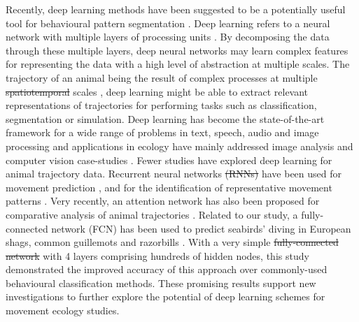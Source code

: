 \documentclass{article}
\providecommand{\DIFaddtex}[1]{{\protect\color{blue}\uwave{#1}}} %
\providecommand{\DIFdeltex}[1]{{\protect\color{red}\sout{#1}}}                      %
\providecommand{\DIFaddbegin}{} %
\providecommand{\DIFaddend}{} %
\providecommand{\DIFdelbegin}{} %
\providecommand{\DIFdelend}{} %
\providecommand{\DIFadd}[1]{\texorpdfstring{\DIFaddtex{#1}}{#1}} %
\providecommand{\DIFdel}[1]{\texorpdfstring{\DIFdeltex{#1}}{}} %
\newcommand{\DIFscaledelfig}{0.5}
\newlength{\DIFdelgraphicswidth} %
\newlength{\DIFdelgraphicsheight} %
\newcommand{\DIFaddincludegraphics}[2][]{{\color{blue}\fbox{\DIFOincludegraphics[#1]{#2}}}} %
\newcommand{\DIFdelincludegraphics}[2][]{%
\sbox{\DIFdelgraphicsbox}{\DIFOincludegraphics[#1]{#2}}%
\settoboxwidth{\DIFdelgraphicswidth}{\DIFdelgraphicsbox} %
\settoboxtotalheight{\DIFdelgraphicsheight}{\DIFdelgraphicsbox} %
\scalebox{\DIFscaledelfig}{%
\parbox[b]{\DIFdelgraphicswidth}{\usebox{\DIFdelgraphicsbox}\\[-\baselineskip] \rule{\DIFdelgraphicswidth}{0em}}\llap{\resizebox{\DIFdelgraphicswidth}{\DIFdelgraphicsheight}{%
\setlength{\unitlength}{\DIFdelgraphicswidth}%
\begin{picture}(1,1)%
\thicklines\linethickness{2pt} %
{\color[rgb]{1,0,0}\put(0,0){\framebox(1,1){}}}%
{\color[rgb]{1,0,0}\put(0,0){\line( 1,1){1}}}%
{\color[rgb]{1,0,0}\put(0,1){\line(1,-1){1}}}%
\end{picture}%
}\hspace*{3pt}}} %
} %
\DeclareRobustCommand{\DIFaddbegin}{\DIFOaddbegin \let\includegraphics\DIFaddincludegraphics} %
\DeclareRobustCommand{\DIFaddend}{\DIFOaddend \let\includegraphics\DIFOincludegraphics} %
\DeclareRobustCommand{\DIFdelbegin}{\DIFOdelbegin \let\includegraphics\DIFdelincludegraphics} %
\DeclareRobustCommand{\DIFdelend}{\DIFOaddend \let\includegraphics\DIFOincludegraphics} %
\begin{document}
Recently, deep learning methods have been suggested to be a potentially useful tool for behavioural pattern segmentation \cite{valletta_applications_2017}. Deep learning refers to a neural network with multiple layers of processing units \cite{lecun_deep_2015}. By decomposing the data through these multiple layers, deep neural networks may learn complex features for representing the data with a high level of abstraction at multiple scales. The trajectory of an animal being the result of complex processes at multiple \DIFdelbegin \DIFdel{spatiotemporal }\DIFdelend \DIFaddbegin \DIFadd{spatio-temporal }\DIFaddend scales \cite{nathan_movement_2008}, deep learning might be able to extract relevant representations of trajectories for performing tasks such as classification, segmentation or simulation. Deep learning has become the state-of-the-art framework for a wide range of problems in text, speech, audio and image processing and applications in ecology have mainly addressed image analysis and computer vision case-studies \cite{weinstein_computer_2018, christin_applications_2019}. Fewer studies have explored deep learning for animal trajectory data. Recurrent neural networks \DIFdelbegin \DIFdel{(RNNs) }\DIFdelend have been used for movement prediction \cite{ardakani_encoding_2017,rew_animal_2019}, and for the identification of representative movement patterns \cite{peng_deep_2019}. Very recently, an attention network has also been proposed for comparative analysis of  animal trajectories
\cite{maekawa_deep_2020}. Related to our study, a fully-connected network (\DIFaddbegin \DIFadd{hereafter, }\DIFaddend FCN) has been used to predict seabirds' diving in European shags, common guillemots and razorbills  \cite{browning_predicting_2018}. With a very simple \DIFdelbegin \DIFdel{fully-connected network }\DIFdelend \DIFaddbegin \DIFadd{FCN }\DIFaddend with 4 layers comprising hundreds of hidden nodes, this study demonstrated the improved accuracy of this approach over commonly-used behavioural classification methods. These promising results support new investigations to further explore the potential of deep learning schemes for movement ecology studies.
\end{document}
